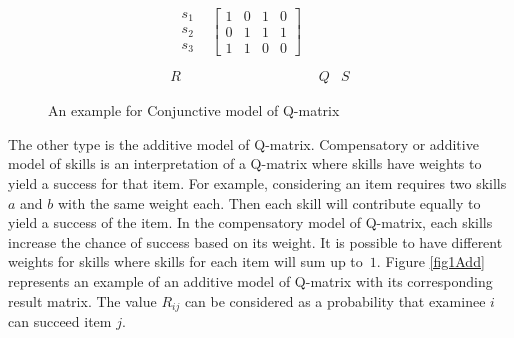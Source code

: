 \begin{figure}
\begin{footnotesize}
\[\begin{array}{ccc}
\begin{array}{cc}
\begin{array}{c}
s_{1}\\
s_{2}\\
s_{3}
\end{array} & \left[\begin{array}{cccc}
1 & 0 & 1 & 0\\
0 & 1 & 1 & 1\\
1 & 1 & 0 & 0
\end{array}\right]
\end{array}\\
\\
R & Q & S
\end{array}
\]
 \end{footnotesize} \caption{An example for Conjunctive model of Q-matrix}


\label{fig1} 
\end{figure}

The other type is the additive model of Q-matrix. Compensatory or additive model of skills is an interpretation of a Q-matrix where skills have weights to yield a success for that item. For example, considering an item requires two skills $a$ and $b$ with the same weight each. Then each skill will contribute equally to yield a success of the item. In the compensatory model of Q-matrix, each skills increase the chance of success based on its weight. It is possible to have different weights for skills where skills for each item will sum up to~$1$. Figure \ref{fig1Add} represents an example of an additive model of Q-matrix with its corresponding result matrix. The value $R_{ij}$  can be considered as a probability that examinee $i$ can succeed item $j$.

